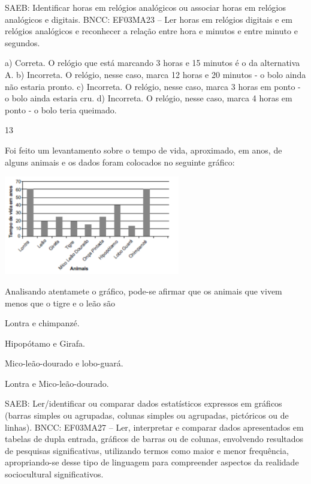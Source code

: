 \begin{multicols}{2}
{\begin{escolha}
{SAEB: Identificar horas em relógios analógicos ou associar horas em relógios analógicos e digitais.
BNCC: EF03MA23 – Ler horas em relógios digitais e em relógios analógicos e reconhecer a relação
entre hora e minutos e entre minuto e segundos.

a) Correta. O relógio que está marcando 3 horas e 15 minutos é o da alternativa A.
b) Incorreta. O relógio, nesse caso, marca 12 horas e 20 minutos - o bolo ainda não estaria pronto.
c) Incorreta. O relógio, nesse caso, marca 3 horas em ponto - o bolo ainda estaria cru.
d) Incorreta. O relógio, nesse caso, marca 4 horas em ponto - o bolo teria queimado.

\num{13}

Foi feito um levantamento sobre o tempo de vida, aproximado, em anos, de alguns animais e os dados foram colocados no seguinte gráfico:

\includegraphics[width=3.02451in,height=1.70004in]{media/image127.png}

Analisando atentamete o gráfico, pode-se afirmar que os animais que vivem menos que o tigre e o leão são

\begin{escolha}

\item
  Lontra e chimpanzé.
\item
  Hipopótamo e Girafa.
\item
  Mico-leão-dourado e lobo-guará.
\item
  Lontra e Mico-leão-dourado.
\end{escolha}

SAEB: Ler/identificar ou comparar dados estatísticos
expressos em gráficos (barras simples ou agrupadas, colunas simples ou agrupadas, pictóricos ou de linhas).
BNCC: EF03MA27 -- Ler, interpretar e comparar dados apresentados em tabelas de dupla entrada,
gráficos de barras ou de colunas, envolvendo resultados de pesquisas significativas, utilizando
termos como maior e menor frequência, apropriando-se desse tipo de linguagem para
compreender aspectos da realidade sociocultural significativos.

}
\end{escolha}}
\end{multicols}
